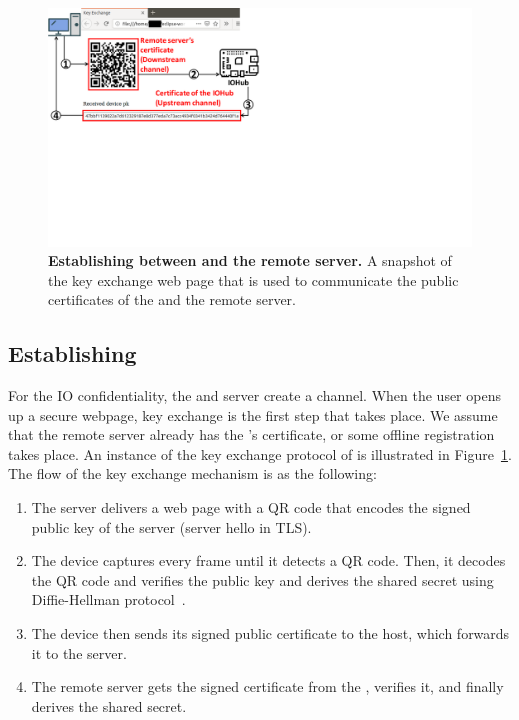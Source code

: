 \begin{figure}[t]
\centering
\includegraphics[trim={0 10cm 17cm 0}, clip, width=0.8\linewidth]{chapters/ProtectIOn/images/keyExchange_1.pdf}
\caption[Establishing \tls between \device and the remote server]{\textbf{Establishing \tls between \device and the remote server.} A snapshot of the key exchange web page that is used to communicate the public certificates of the \device and the remote server.}
\label{fig:keyExchange}
\centering
\end{figure} 

\subsection{Establishing \tls}
\label{sec:prototype:impl:tls}
%
For the IO confidentiality, the \device and server create a \tls channel. When the user opens up a secure webpage, key exchange is the first step that takes place. We assume that the remote server already has the \device's certificate, or some offline registration takes place. An instance of the key exchange protocol of \name is illustrated in Figure~\ref{fig:keyExchange}. The flow of the key exchange mechanism is as the following:
\begin{enumerate}
  \item[\one] The server delivers a web page with a QR code that encodes the signed public key of the server (server hello in TLS). 
  \item[\two] The device captures every frame until it detects a QR code. Then, it decodes the QR code and verifies the public key and derives the shared secret using Diffie-Hellman protocol~\cite{blake1998authenticated}. 
  \item[\three] The device then sends its signed public certificate to the host, which forwards it to the server.
  \item[\four] The remote server gets the signed certificate from the \device, verifies it, and finally derives the shared secret.
\end{enumerate}

